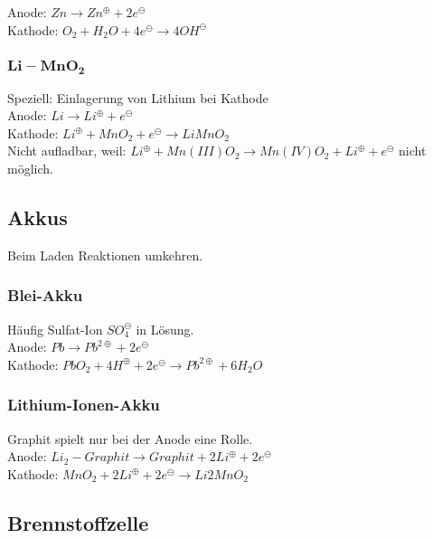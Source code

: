 Anode: $Zn \rightarrow Zn^\oplus + 2e^\ominus$\\

Kathode: $O_2 + H_2O + 4e^\ominus \rightarrow 4OH^\ominus$


\subsubsection{$\boldsymbol{Li-MnO_2}$}

Speziell: Einlagerung von Lithium bei Kathode\\

Anode: $Li \rightarrow Li^\oplus + e^\ominus$\\

Kathode: $Li^\oplus + MnO_2 + e^\ominus \rightarrow LiMnO_2$\\

Nicht aufladbar, weil: $Li^\oplus + Mn(III)O_2 \rightarrow Mn(IV)O_2 + Li^\oplus + e^\ominus$ nicht möglich.

\subsection{Akkus}

Beim Laden Reaktionen umkehren.

\subsubsection{Blei-Akku}

Häufig Sulfat-Ion $SO_4^\ominus$ in Lösung.\\

Anode: $Pb \rightarrow Pb^{2\oplus}+2e^\ominus$\\

Kathode: $PbO_2 + 4 H^\oplus + 2e^\ominus \rightarrow Pb^{2\oplus} + 6H_2O$

\subsubsection{Lithium-Ionen-Akku}

Graphit spielt nur bei der Anode eine Rolle.\\

Anode: $Li_2-Graphit \rightarrow  Graphit + 2Li^\oplus + 2e^\ominus$\\

Kathode: $MnO_2+2Li^\oplus + 2e^\ominus \rightarrow Li2MnO_2$

\subsection{Brennstoffzelle}

